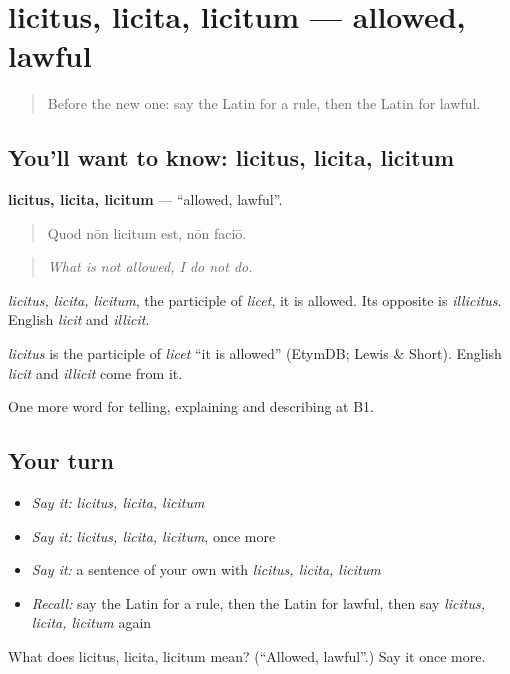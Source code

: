 \section[licitus, licita, licitum]{licitus, licita, licitum — allowed, lawful}

\label{lesson:LA-C409-licitus}



\begin{quote}
Before the new one: say the Latin for a rule, then the Latin for lawful.
\end{quote}

\subsection*{You'll want to know: licitus, licita, licitum}
\textbf{licitus, licita, licitum} — \textquotedblleft{}allowed, lawful\textquotedblright{}.

\begin{quote}
Quod nōn licitum est, nōn faciō.
\end{quote}

\begin{quote}
\emph{What is not allowed, I do not do.}
\end{quote}

\emph{licitus, licita, licitum}, the participle of \emph{licet}, it is allowed. Its opposite is \emph{illicitus}. English \emph{licit} and \emph{illicit}.

\begin{cousinweb}
\emph{licitus} is the participle of \emph{licet} \textquotedblleft{}it is allowed\textquotedblright{} (EtymDB; Lewis \& Short). English \emph{licit} and \emph{illicit} come from it.
\end{cousinweb}

\begin{grammarlens}[title={What you've built}]
One more word for telling, explaining and describing at B1.
\end{grammarlens}

\subsection*{Your turn}
\begin{itemize}
\raggedright
  \item \emph{Say it:} \emph{licitus, licita, licitum}
  \item \emph{Say it:} \emph{licitus, licita, licitum}, once more
  \item \emph{Say it:} a sentence of your own with \emph{licitus, licita, licitum}
  \item \emph{Recall:} say the Latin for a rule, then the Latin for lawful, then say \emph{licitus, licita, licitum} again
\end{itemize}

\begin{tcolorbox}[breakable,colback=teal!4,colframe=teal!35!black,title={Before you move on}]
What does licitus, licita, licitum mean? (\textquotedblleft{}Allowed, lawful\textquotedblright{}.) Say it once more.
\end{tcolorbox}
